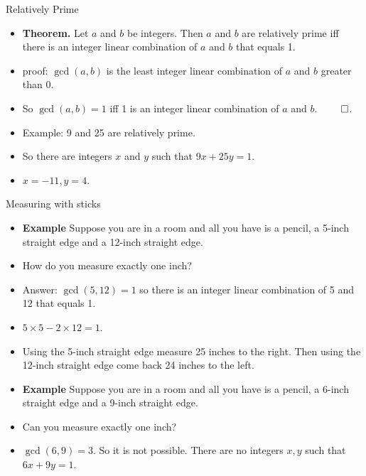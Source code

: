 \documentclass[handout]{beamer}
\begin{document}

\begin{frame}{Relatively Prime}

\begin{itemize}
  \item \textbf{Theorem.} Let $a$ and $b$ be integers. Then $a$ and $b$ are relatively prime iff there is an
  integer linear combination of $a$ and $b$ that equals 1.
  \item proof: $\gcd(a,b)$ is the least integer linear combination of $a$ and $b$ greater than 0.
  \item So $\gcd(a,b) =  1$ iff 1 is an integer linear combination of $a$ and $b$. $\qed$.
  \item  Example: 9 and 25 are relatively prime.
  \item So there are integers $x$ and $y$ such that $9x + 25y = 1$.
  \item $x=-11, y=4$.
\end{itemize}

\end{frame}


\begin{frame}{Measuring with sticks}

\begin{itemize}
  \item \textbf{Example} Suppose you are in a room and all you have is a pencil, a 5-inch straight edge and a 12-inch straight edge.
  \item How do you measure exactly one inch?
  \item Answer: $\gcd(5,12)=1$ so there is an integer linear combination of 5 and 12 that equals 1.
  \item $5\times 5 - 2 \times 12 = 1$.
  \item Using the 5-inch straight edge measure 25 inches to the right. Then using the 12-inch straight edge
  come back 24 inches to the left.
  \item \textbf{Example} Suppose you are in a room and all you have is a pencil, a 6-inch straight edge and a 9-inch straight edge.
  \item Can you measure exactly one inch?
  \item $\gcd(6,9) = 3$. So it is not possible. There are no integers $x,y$ such that $6x + 9y = 1$.
\end{itemize}

\end{frame}
\end{document}
